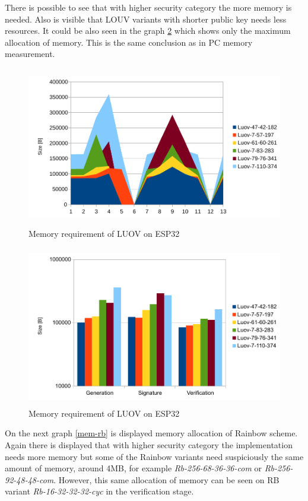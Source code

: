 \documentclass[thesis=M,english]{FITthesis}[2019/12/23]
\begin{document}
\bigskip
\noindent
There is possible to see that with higher security category the more memory is needed. Also is visible that LOUV variants with shorter public key needs less resources. It could be also seen in the graph \ref{mem-luov} which shows only the maximum allocation of memory. This is the same conclusion as in PC memory measurement. 

\newpage
\bigskip\bigskip
\begin{figure}[H]
\centering
\includegraphics[width=13cm,height=7cm]{images/mem-luov0.pdf}
\caption{Memory requirement of LUOV on ESP32}
\label{mem-luov0}
\end{figure}

\bigskip\bigskip\bigskip
\begin{figure}[H]
\centering
\includegraphics[width=13cm,height=7cm]{images/mem-luov.pdf}
\caption{Memory requirement of LUOV on ESP32}
\label{mem-luov}
\end{figure}

\newpage
\noindent
On the next graph \ref{mem-rb} is displayed memory allocation of Rainbow scheme. Again there is displayed that with higher security category the implementation needs more memory but some of the Rainbow variants need suspiciously the same amount of memory, around 4MB, for example \textit{Rb-256-68-36-36-com} or \textit{Rb-256-92-48-48-com}. However, this same allocation of memory can be seen on RB variant \textit{Rb-16-32-32-32-cyc} in the verification stage. 
\end{document}
